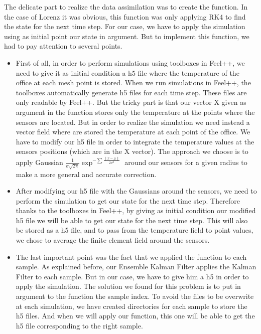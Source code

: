 \newline
\newline \noindent The delicate part to realize the data assimilation was to create the  function. In the case of Lorenz it was obvious, this function was only applying RK4 to find the state for the next time step. For our case, we have to apply the simulation using as initial point our state in argument. But to implement this function, we had to pay attention to several points. 
\begin{itemize}
    \item First of all, in order to perform simulations using toolboxes in Feel++, we need to give it as initial condition a h5 file where the temperature of the office at each mesh point is stored. When we run simulations in Feel++, the toolboxes automatically generate h5 files for each time step. These files are only readable by Feel++. But the tricky part is that our vector X given as argument in the function  stores only the temperature at the points where the sensors are located. But in order to realize the simulation we need instead a vector field where are stored the temperature at each point of the office. We have to modify our h5 file in order to integrate the temperature values at the sensors positions (which are in the X vector). The approach we choose is to apply Gaussian  $\frac{1}{\sigma \sqrt{2 \pi}}\exp ^{-\sum \frac{\|x-\mu\|}{2 \sigma^2}}$ around our sensors for a given radius to make a more general and accurate correction.
   
    \item After modifying our h5 file with the Gaussians around the sensors, we need to perform the simulation to get our state for the next time step. Therefore thanks to the toolboxes in Feel++, by giving as initial condition our modified h5 file we will be able to get our state for the next time step. This will also be stored as a h5 file, and to pass from the temperature field to point values, we chose to average the finite element field around the sensors.  
    \item The last important point was the fact that we applied the  function to each sample. As explained before, our Ensemble Kalman Filter applies the Kalman Filter to each sample. But in our case, we have to give him a h5 in order to apply the simulation. The solution we found for this problem is to put in argument to the  function the sample index. To avoid the files to be overwrite at each simulation, we have created directories for each sample to store the h5 files. And when we will apply our  function, this one will be able to get the h5 file corresponding to the right sample.
\end{itemize}
